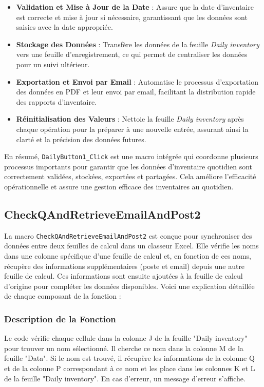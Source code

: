 \documentclass[a4paper, oneside, 12pt, final]{extreport}
\begin{document}
\begin{itemize}
    \item \textbf{Validation et Mise à Jour de la Date} : Assure que la date d'inventaire est correcte et mise à jour si nécessaire, garantissant que les données sont saisies avec la date appropriée.
    \item \textbf{Stockage des Données} : Transfère les données de la feuille \textit{Daily inventory} vers une feuille d'enregistrement, ce qui permet de centraliser les données pour un suivi ultérieur.
    \item \textbf{Exportation et Envoi par Email} : Automatise le processus d'exportation des données en PDF et leur envoi par email, facilitant la distribution rapide des rapports d'inventaire.
    \item \textbf{Réinitialisation des Valeurs} : Nettoie la feuille \textit{Daily inventory} après chaque opération pour la préparer à une nouvelle entrée, assurant ainsi la clarté et la précision des données futures.
\end{itemize}

En résumé, \texttt{DailyButton1\_Click} est une macro intégrée qui coordonne plusieurs processus importants pour garantir que les données d'inventaire quotidien sont correctement validées, stockées, exportées et partagées. Cela améliore l'efficacité opérationnelle et assure une gestion efficace des inventaires au quotidien.
\subsection{CheckQAndRetrieveEmailAndPost2}

La macro \texttt{CheckQAndRetrieveEmailAndPost2} est conçue pour synchroniser des données entre deux feuilles de calcul dans un classeur Excel. Elle vérifie les noms dans une colonne spécifique d'une feuille de calcul et, en fonction de ces noms, récupère des informations supplémentaires (poste et email) depuis une autre feuille de calcul. Ces informations sont ensuite ajoutées à la feuille de calcul d'origine pour compléter les données disponibles. Voici une explication détaillée de chaque composant de la fonction :

\subsubsection{Description de la Fonction}
Le code vérifie chaque cellule dans la colonne J de la feuille "Daily inventory" pour trouver un nom sélectionné. Il cherche ce nom dans la colonne M de la feuille "Data". Si le nom est trouvé, il récupère les informations de la colonne Q et de la colonne P correspondant à ce nom et les place dans les colonnes K et L de la feuille "Daily inventory". En cas d'erreur, un message d'erreur s'affiche.
\end{document}
